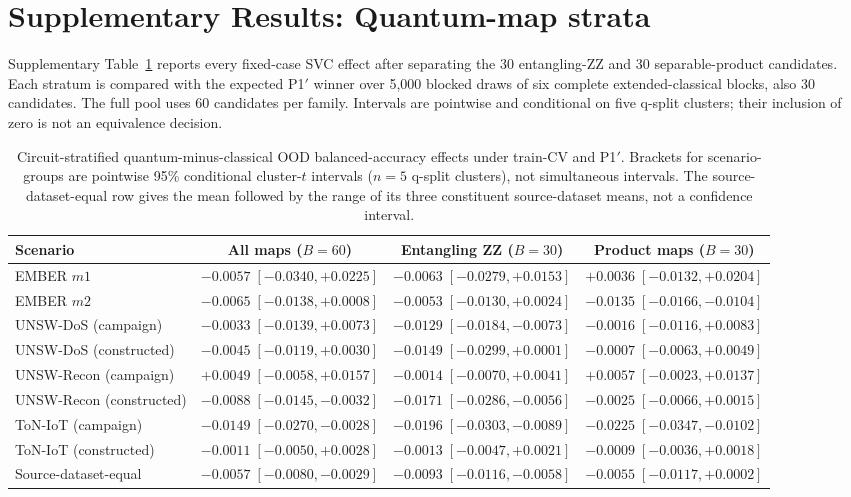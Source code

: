 \documentclass[11pt]{article}
\begin{document}
\clearpage
\section*{Supplementary Results: Quantum-map strata}
\label{supp:quantum_strata}

Supplementary Table~\ref{supp:tab_quantum_strata} reports every fixed-case SVC effect after
separating the 30 entangling-ZZ and 30 separable-product candidates. Each
stratum is compared with the expected P1$'$ winner over 5,000 blocked draws
of six complete extended-classical blocks, also 30 candidates. The full pool
uses 60 candidates per family. Intervals are pointwise and conditional on five
q-split clusters; their inclusion of zero is not an equivalence decision.

\begin{table}[ht]
\centering
\caption{Circuit-stratified quantum-minus-classical OOD balanced-accuracy
effects under train-CV and P1$'$. Brackets for scenario-groups are pointwise
95\% conditional cluster-$t$ intervals ($n=5$ q-split clusters), not
simultaneous intervals. The source-dataset-equal row gives the mean followed
by the range of its three constituent source-dataset means, not a confidence
interval.}
\label{supp:tab_quantum_strata}
\scriptsize
\setlength{\tabcolsep}{3pt}
\begin{tabular}{lccc}
\toprule
Scenario & All maps ($B=60$) & Entangling ZZ ($B=30$) & Product maps ($B=30$) \\
\midrule
EMBER $m1$ & $-0.0057\;[-0.0340,+0.0225]$ & $-0.0063\;[-0.0279,+0.0153]$ & $+0.0036\;[-0.0132,+0.0204]$ \\
EMBER $m2$ & $-0.0065\;[-0.0138,+0.0008]$ & $-0.0053\;[-0.0130,+0.0024]$ & $-0.0135\;[-0.0166,-0.0104]$ \\
UNSW-DoS (campaign) & $-0.0033\;[-0.0139,+0.0073]$ & $-0.0129\;[-0.0184,-0.0073]$ & $-0.0016\;[-0.0116,+0.0083]$ \\
UNSW-DoS (constructed) & $-0.0045\;[-0.0119,+0.0030]$ & $-0.0149\;[-0.0299,+0.0001]$ & $-0.0007\;[-0.0063,+0.0049]$ \\
UNSW-Recon (campaign) & $+0.0049\;[-0.0058,+0.0157]$ & $-0.0014\;[-0.0070,+0.0041]$ & $+0.0057\;[-0.0023,+0.0137]$ \\
UNSW-Recon (constructed) & $-0.0088\;[-0.0145,-0.0032]$ & $-0.0171\;[-0.0286,-0.0056]$ & $-0.0025\;[-0.0066,+0.0015]$ \\
ToN-IoT (campaign) & $-0.0149\;[-0.0270,-0.0028]$ & $-0.0196\;[-0.0303,-0.0089]$ & $-0.0225\;[-0.0347,-0.0102]$ \\
ToN-IoT (constructed) & $-0.0011\;[-0.0050,+0.0028]$ & $-0.0013\;[-0.0047,+0.0021]$ & $-0.0009\;[-0.0036,+0.0018]$ \\
\midrule
Source-dataset-equal & $-0.0057\;[-0.0080,-0.0029]$ & $-0.0093\;[-0.0116,-0.0058]$ & $-0.0055\;[-0.0117,+0.0002]$ \\
\bottomrule
\end{tabular}
\end{table}
\end{document}

